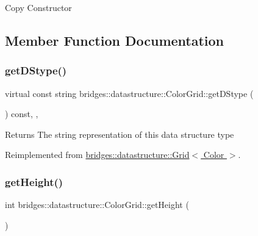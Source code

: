Copy Constructor 

\subsection{Member Function Documentation}
\mbox{\label{classbridges_1_1datastructure_1_1_color_grid_afad945d648b427ca183a1dface8249b7}} 
\subsubsection{\texorpdfstring{get\+D\+Stype()}{getDStype()}}
{\footnotesize\ttfamily virtual const string bridges\+::datastructure\+::\+Color\+Grid\+::get\+D\+Stype (\begin{DoxyParamCaption}{ }\end{DoxyParamCaption}) const\hspace{0.3cm}{\ttfamily [inline]}, {\ttfamily [override]}, {\ttfamily [virtual]}}

\begin{DoxyReturn}{Returns}
The string representation of this data structure type 
\end{DoxyReturn}


Reimplemented from \hyperlink{classbridges_1_1datastructure_1_1_grid_a16aeae38446b96f440dea15f2b19334d}{bridges\+::datastructure\+::\+Grid$<$ Color $>$}.

\mbox{\label{classbridges_1_1datastructure_1_1_color_grid_ab437905ec904f941cd58d3393c3a5700}} 
\subsubsection{\texorpdfstring{get\+Height()}{getHeight()}}
{\footnotesize\ttfamily int bridges\+::datastructure\+::\+Color\+Grid\+::get\+Height (\begin{DoxyParamCaption}{ }\end{DoxyParamCaption})\hspace{0.3cm}{\ttfamily [inline]}}


